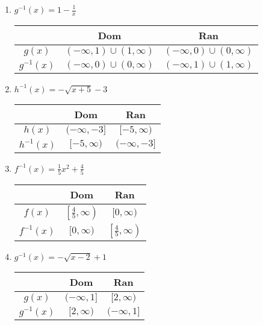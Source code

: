 \begin{enumerate}
     \item $g^{-1}(x) = 1 - \frac{1}{x}$  \newline\\
\begin{tabular}{c|c|c}
            &   Dom             &   Ran \\  \hline
    $g(x)$  &   $(-\infty,1)\cup(1,\infty)$    &   $(-\infty,0)\cup(0,\infty)$   \\  \hline
    $g^{-1}(x)$ &   $(-\infty,0)\cup(0,\infty)$   &   $(-\infty,1)\cup(1,\infty)$    \\
\end{tabular}

\item $h^{-1}(x) = -\sqrt{x+5}-3$ \newline\\ 
\begin{tabular}{c|c|c}
            &   Dom             &   Ran \\  \hline
    $h(x)$  &   $(-\infty,-3]$    &   $[-5,\infty)$   \\  \hline
    $h^{-1}(x)$ &   $[-5,\infty)$   &   $(-\infty,-3]$    \\
\end{tabular}

\item $f^{-1}(x) = \frac{1}{5}x^2 + \frac{4}{5}$    \newline\\
    \setlength{\extrarowheight}{5pt}
    \begin{tabular}{c|c|c}
            &   Dom &   Ran \\  \hline
        $f(x)$  &   $\left[\frac{4}{5}, \infty\right)$  &   $[0, \infty)$    \\ \hline
        $f^{-1}(x)$ &   $[0, \infty)$   &   $\left[\frac{4}{5}, \infty\right)$  \\
    \end{tabular}
    
\item $g^{-1}(x) = -\sqrt{x-2}+1$   \newline\\
    \begin{tabular}{c|c|c}
            &   Dom &   Ran \\  \hline
        $g(x)$  &   $(-\infty, 1]$  &   $[2, \infty)$    \\  \hline
        $g^{-1}(x)$ &   $[2, \infty)$   &   $(-\infty, 1]$  \\
    \end{tabular}
    

\end{enumerate}
